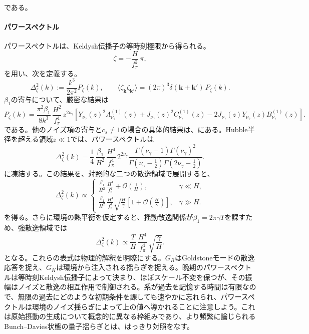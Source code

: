 \documentclass[a4paper,11pt,oneside]{article}
\theoremstyle{definition}
\numberwithin{equation}{section}
\begin{document}
である。\paragraph{パワースペクトル} パワースペクトルは、Keldysh伝播子の等時刻極限から得られる。
\begin{equation}
\zeta=-\frac{H}{f_\pi^2}\,\pi ,
\end{equation}
を用い、次を定義する。
\begin{equation}
\Delta_\zeta^2(k)
:=
\frac{k^3}{2\pi^2}P_\zeta(k),
\qquad
\langle \zeta_{\mathbf k}\zeta_{\mathbf k'}\rangle
=
(2\pi)^3\delta(\mathbf k+\mathbf k')\,P_\zeta(k) .
\end{equation}
\(\beta_1\)の寄与について、厳密な結果は
\begin{equation}
P_\zeta(k)
=
\frac{\pi^2\beta_1}{8k^3}\,
\frac{H^2}{f_\pi^4}\,
z^{2\nu_\gamma}
\left[
Y_{\nu_\gamma}(z)^2A^{(1)}_{\nu_\gamma}(z)
+
J_{\nu_\gamma}(z)^2C^{(1)}_{\nu_\gamma}(z)
-
2J_{\nu_\gamma}(z)Y_{\nu_\gamma}(z)B^{(1)}_{\nu_\gamma}(z)
\right] .
\end{equation}
である。他のノイズ項の寄与と$  c_{s}\neq 1 $の場合の具体的結果は、\cite{Salcedo:2024smn}にある。Hubble半径を超える領域\(z\ll 1\)では、パワースペクトルは
\begin{equation}
\Delta_\zeta^2(k)
=
\frac14\,
\frac{\beta_1}{H^2}\,
\frac{H^4}{f_\pi^4}\,
2^{2\nu_\gamma}
\frac{
\Gamma(\nu_\gamma-1)\Gamma(\nu_\gamma)^2
}{
\Gamma\!\left(\nu_\gamma-\frac12\right)
\Gamma\!\left(2\nu_\gamma-\frac12\right)
} .
\end{equation}
に凍結する。この結果を、対照的な二つの散逸領域で展開すると、
\begin{equation}
\Delta_\zeta^2(k)\propto
\begin{cases}
\displaystyle
\frac{\beta_1}{H^2}\,\frac{H^4}{f_\pi^4}
+\mathcal O\!\left(\frac{\gamma}{H}\right),
& \gamma\ll H, \\[1.2em]
\displaystyle
\frac{\beta_1}{H^2}\,\frac{H^4}{f_\pi^4}
\sqrt{\frac{H}{\gamma}}
\left[
1+\mathcal O\!\left(\frac{H}{\gamma}\right)
\right],
& \gamma\gg H .
\end{cases}
\end{equation}
を得る。さらに環境の熱平衡を仮定すると、揺動散逸関係が\(\beta_1=2\pi\gamma T\)を課すため、強散逸領域では
\begin{equation}
\Delta_\zeta^2(k)
\propto
\frac{T}{H}\,
\frac{H^4}{f_\pi^4}\,
\sqrt{\frac{\gamma}{H}} .
\end{equation}
となる。これらの表式は物理的解釈を明瞭にする。\(G_R\)はGoldstoneモードの散逸応答を捉え、\(G_K\)は環境から注入される揺らぎを捉える。晩期のパワースペクトルは等時刻Keldysh伝播子によって決まり、ほぼスケール不変を保つが、その振幅はノイズと散逸の相互作用で制御される。系が過去を記憶する時間は有限なので、無限の過去にどのような初期条件を課しても速やかに忘れられ、パワースペクトルは環境のノイズ揺らぎによって上の値へ導かれることに注意しよう。これは原始摂動の生成について概念的に異なる枠組みであり、より頻繁に論じられるBunch--Davies状態の量子揺らぎとは、はっきり対照をなす。
\end{document}
